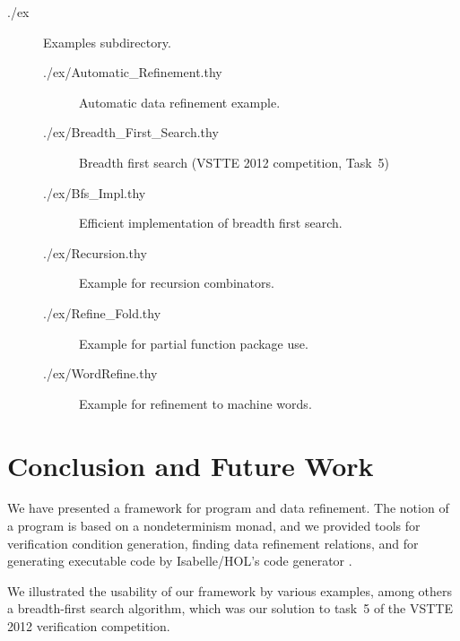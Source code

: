 \documentclass[11pt,a4paper]{book}
\begin{document}
\begin{description}
\item[./ex] Examples subdirectory.
\begin{description}
\item[./ex/Automatic\_Refinement.thy] Automatic data refinement example.
\item[./ex/Breadth\_First\_Search.thy] Breadth first search (VSTTE 2012 competition, Task~5)
\item[./ex/Bfs\_Impl.thy] Efficient implementation of breadth first search. 
\item[./ex/Recursion.thy] Example for recursion combinators.
\item[./ex/Refine\_Fold.thy] Example for partial function package use.
\item[./ex/WordRefine.thy] Example for refinement to machine words.
\end{description}

\end{description}





\chapter{Conclusion and Future Work}
We have presented a framework for program and data refinement.
The notion of a program is based on a nondeterminism monad, and we provided
tools for verification condition generation, finding data 
refinement relations, and for generating executable code by 
Isabelle/HOL's code generator \cite{Haft09,HaNi10}.

We illustrated the usability of our framework by various examples, among others
a breadth-first search algorithm, which was our solution to task~5 of the VSTTE 
2012 verification competition.
\end{document}
